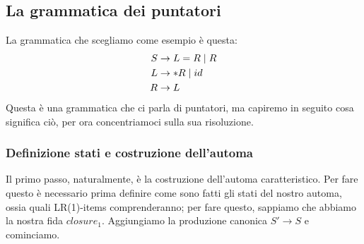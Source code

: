 \documentclass[class=book, crop=false, oneside, 12pt]{standalone}
\begin{document}
\subsection{La grammatica dei puntatori}
La grammatica che scegliamo come esempio è questa:
\begin{align}
    \label{gr:pointers-grammar}
    S &\to L = R \mid R \\
    L &\to *R \mid id \nonumber \\ \notag
    R &\to L \notag
\end{align}
Questa è una grammatica che ci parla di puntatori, ma capiremo in seguito cosa significa ciò, per ora concentriamoci sulla sua risoluzione. 

\subsubsection{Definizione stati e costruzione dell'automa}
Il primo passo, naturalmente, è la costruzione dell'automa caratteristico. Per fare questo è necessario prima definire come sono fatti gli stati del nostro automa, ossia quali LR(1)-items comprenderanno; per fare questo, sappiamo che abbiamo la nostra fida \(closure_1\). Aggiungiamo la produzione canonica \(S' \to S\) e cominciamo.
\end{document}
